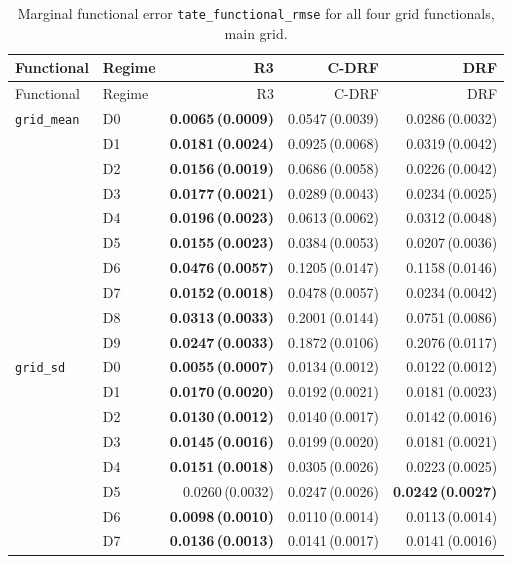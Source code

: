 \begingroup
\tiny
\setlength{\tabcolsep}{2.6pt}
\begin{longtable}{@{}llrrr@{}}
\caption{Marginal functional error \texttt{tate\_functional\_rmse} for all four grid functionals, main grid.}\label{tab:all-tate}\\
\toprule
Functional & Regime & R3 & C-DRF & DRF \\
\midrule
\endfirsthead
\toprule
Functional & Regime & R3 & C-DRF & DRF \\
\midrule
\endhead
\bottomrule
\endfoot
\texttt{grid\_mean} & D0 & \textbf{0.0065\,(0.0009)} & 0.0547\,(0.0039) & 0.0286\,(0.0032) \\
 & D1 & \textbf{0.0181\,(0.0024)} & 0.0925\,(0.0068) & 0.0319\,(0.0042) \\
 & D2 & \textbf{0.0156\,(0.0019)} & 0.0686\,(0.0058) & 0.0226\,(0.0042) \\
 & D3 & \textbf{0.0177\,(0.0021)} & 0.0289\,(0.0043) & 0.0234\,(0.0025) \\
 & D4 & \textbf{0.0196\,(0.0023)} & 0.0613\,(0.0062) & 0.0312\,(0.0048) \\
 & D5 & \textbf{0.0155\,(0.0023)} & 0.0384\,(0.0053) & 0.0207\,(0.0036) \\
 & D6 & \textbf{0.0476\,(0.0057)} & 0.1205\,(0.0147) & 0.1158\,(0.0146) \\
 & D7 & \textbf{0.0152\,(0.0018)} & 0.0478\,(0.0057) & 0.0234\,(0.0042) \\
 & D8 & \textbf{0.0313\,(0.0033)} & 0.2001\,(0.0144) & 0.0751\,(0.0086) \\
 & D9 & \textbf{0.0247\,(0.0033)} & 0.1872\,(0.0106) & 0.2076\,(0.0117) \\
\midrule
\texttt{grid\_sd} & D0 & \textbf{0.0055\,(0.0007)} & 0.0134\,(0.0012) & 0.0122\,(0.0012) \\
 & D1 & \textbf{0.0170\,(0.0020)} & 0.0192\,(0.0021) & 0.0181\,(0.0023) \\
 & D2 & \textbf{0.0130\,(0.0012)} & 0.0140\,(0.0017) & 0.0142\,(0.0016) \\
 & D3 & \textbf{0.0145\,(0.0016)} & 0.0199\,(0.0020) & 0.0181\,(0.0021) \\
 & D4 & \textbf{0.0151\,(0.0018)} & 0.0305\,(0.0026) & 0.0223\,(0.0025) \\
 & D5 & 0.0260\,(0.0032) & 0.0247\,(0.0026) & \textbf{0.0242\,(0.0027)} \\
 & D6 & \textbf{0.0098\,(0.0010)} & 0.0110\,(0.0014) & 0.0113\,(0.0014) \\
 & D7 & \textbf{0.0136\,(0.0013)} & 0.0141\,(0.0017) & 0.0141\,(0.0016) \\

\end{longtable}
